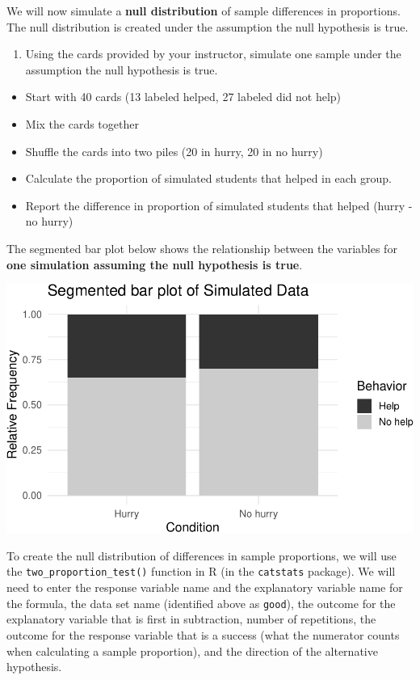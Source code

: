 \documentclass[
]{report}
\providecommand{\tightlist}{%
  \setlength{\itemsep}{0pt}\setlength{\parskip}{0pt}}
\begin{document}
We will now simulate a \textbf{null distribution} of sample differences in proportions. The null distribution is created under the assumption the null hypothesis is true.

\begin{enumerate}
\def\labelenumi{\arabic{enumi}.}
\setcounter{enumi}{6}
\tightlist
\item
  Using the cards provided by your instructor, simulate one sample under the assumption the null hypothesis is true.
\end{enumerate}

\begin{itemize}
\item
  Start with 40 cards (13 labeled helped, 27 labeled did not help)
\item
  Mix the cards together
\item
  Shuffle the cards into two piles (20 in hurry, 20 in no hurry)
\item
  Calculate the proportion of simulated students that helped in each group.
\item
  Report the difference in proportion of simulated students that helped (hurry - no hurry)
\end{itemize}

The segmented bar plot below shows the relationship between the variables for \textbf{one simulation assuming the null hypothesis is true}.

\begin{center}\includegraphics[width=0.6\linewidth]{08-A18-inference-2cat-simulationtest_files/figure-latex/unnamed-chunk-4-1} \end{center}

\newpage

To create the null distribution of differences in sample proportions, we will use the \texttt{two\_proportion\_test()} function in R (in the \texttt{catstats} package). We will need to enter the response variable name and the explanatory variable name for the formula, the data set name (identified above as \texttt{good}), the outcome for the explanatory variable that is first in subtraction, number of repetitions, the outcome for the response variable that is a success (what the numerator counts when calculating a sample proportion), and the direction of the alternative hypothesis.
\end{document}
